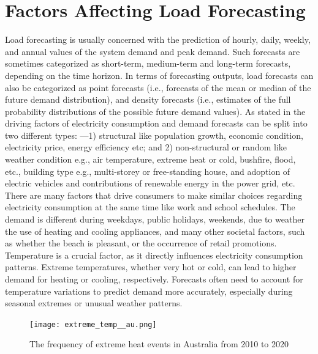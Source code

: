 \documentclass[mstat,12pt]{unswthesis}
\begin{document}
\section{Factors Affecting Load
Forecasting}\label{factors-affecting-load-forecasting}

Load forecasting is usually concerned with the prediction of hourly,
daily, weekly, and annual values of the system demand and peak demand.
Such forecasts are sometimes categorized as short-term, medium-term and
long-term forecasts, depending on the time horizon. In terms of
forecasting outputs, load forecasts can also be categorized as point
forecasts (i.e., forecasts of the mean or median of the future demand
distribution), and density forecasts (i.e., estimates of the full
probability distributions of the possible future demand values). As
stated in \cite{nsw_epa_2021_energy_consumption} the driving factors of
electricity consumption and demand forecasts can be split into two
different types: ---1) structural like population growth, economic
condition, electricity price, energy efficiency etc; and 2)
non-structural or random like weather condition e.g., air temperature,
extreme heat or cold, bushfire, flood, etc., building type e.g.,
multi-storey or free-standing house, and adoption of electric vehicles
and contributions of renewable energy in the power grid, etc. There are
many factors that drive consumers to make similar choices regarding
electricity consumption at the same time like work and school schedules.
The demand is different during weekdays, public holidays, weekends, due
to weather the use of heating and cooling appliances, and many other
societal factors, such as whether the beach is pleasant, or the
occurrence of retail promotions. Temperature is a crucial factor, as it
directly influences electricity consumption patterns. Extreme
temperatures, whether very hot or cold, can lead to higher demand for
heating or cooling, respectively. Forecasts often need to account for
temperature variations to predict demand more accurately, especially
during seasonal extremes or unusual weather patterns.

\begin{figure}[H]
\centering
\texttt{[image: extreme\_temp\_\_au.png]}
\caption{The frequency of extreme heat events in Australia from 2010 to 2020}\label{extreme}
\end{figure}
\end{document}
